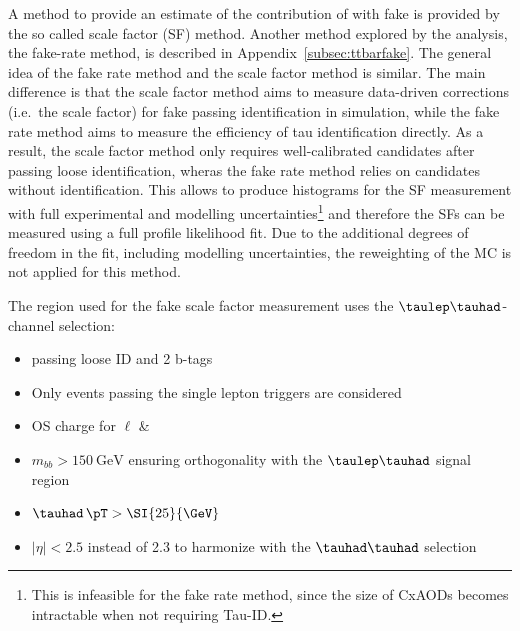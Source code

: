 A method to provide an estimate of the contribution of \ttbar with
fake \tauhad is provided by the so called scale factor (SF) method. Another method
explored by the analysis, the fake-rate method, is described in Appendix~\ref{subsec:ttbarfake}.
The general idea of the fake rate method and the scale factor method is similar. The main
difference is that the scale factor method aims to measure data-driven
corrections (i.e.\ the scale factor) for fake \tauhad passing identification in
\ttbar simulation, while the fake rate method aims to measure the efficiency
of tau identification directly. As a result, the scale factor method only
requires well-calibrated \tauhad candidates after passing loose identification,
wheras the fake rate method relies on \tauhad candidates without identification.
This allows to produce histograms for the SF measurement with full experimental
and modelling uncertainties\footnote{This is infeasible for the fake rate
  method, since the size of CxAODs becomes intractable when not requiring
  Tau-ID.} and therefore the SFs can be measured using a full profile likelihood
fit. Due to the additional degrees of freedom in the fit, including \ttbar
modelling uncertainties, the reweighting of the \ttbar MC is not applied for
this method.

The region used for the fake \tauhad scale factor measurement uses the
$\taulep\tauhad$-channel selection:
\begin{itemize}
\item \tauhad passing loose ID and 2 b-tags
\item Only events passing the single lepton triggers are considered
\item OS charge for $\ell$ \& \tauhad
\item $m_{bb} > \SI{150}{\GeV}$ ensuring orthogonality with the $\taulep\tauhad$
  signal region
\item $\tauhad \, \pT > \SI{25}{\GeV}$
\item \tauhad $\left|\eta\right| < 2.5$ instead of 2.3 to harmonize with the
  $\tauhad\tauhad$ selection
\end{itemize}

